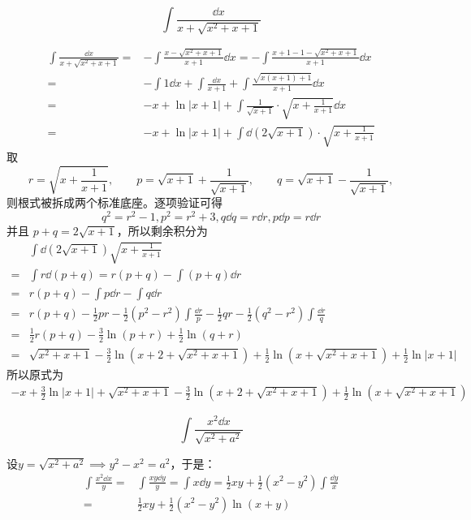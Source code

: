 \begin{example}
\[\int\frac{\dd x}{x+\sqrt{x^2+x+1}}\]
\end{example}
\begin{solution}
\begin{align*}
\int\frac{\dd x}{x+\sqrt{x^2+x+1}}=&-\int\frac{x-\sqrt{x^{2}+x+1}}{x+1}\dd x=-\int\frac{x+1-1-\sqrt{x^{2}+x+1}}{x+1}\dd x\\
=&-\int1\dd x+\int\frac{\dd x}{x+1}+\int\frac{\sqrt{x(x+1)+1}}{x+1}\dd x\\
=&-x+\ln|x+1|+\int\frac{1}{\sqrt{x+1}}\cdot\sqrt{x+\frac{1}{x+1}}\dd x\\
=&-x+\ln|x+1|+\int \dd(2\sqrt{x+1})\cdot\sqrt{x+\frac{1}{x+1}}
\end{align*}
取
\[
r=\sqrt{x+\frac{1}{x+1}},\qquad
p=\sqrt{x+1}+\frac{1}{\sqrt{x+1}},\qquad
q=\sqrt{x+1}-\frac{1}{\sqrt{x+1}},
\]
则根式被拆成两个标准底座。逐项验证可得
\[q^2=r^2-1,p^2=r^2+3,q\dd q=r\dd r,p\dd p=r\dd r\]
并且 \(p+q=2\sqrt{x+1}\)，所以剩余积分为
\begin{align*}
&\int \dd(2\sqrt{x+1})\sqrt{x+\frac{1}{x+1}}\\
=&\int r\dd(p+q)=r(p+q)-\int(p+q)\dd r\\
=&r(p+q)-\int p\dd r-\int q\dd r\\
=&r(p+q)-\frac{1}{2}pr-\frac12(p^2-r^2)\int\frac{\dd r}{p}-\frac12qr-\frac12(q^2-r^2)\int\frac{\dd r}{q}\\
=&\frac12r(p+q)-\frac32\ln(p+r)+\frac12\ln(q+r)\\
=&\sqrt{x^2+x+1}-\frac32\ln(x+2+\sqrt{x^2+x+1})+\frac12\ln(x+\sqrt{x^2+x+1})+\frac12\ln|x+1|
\end{align*}
所以原式为
\begin{align*}
-x+\frac32\ln|x+1|+\sqrt{x^2+x+1}-\frac32\ln(x+2+\sqrt{x^2+x+1})+\frac12\ln(x+\sqrt{x^2+x+1})
\end{align*}
\end{solution}

\begin{example}
\[\int\frac{x^2\dd x}{\sqrt{x^2+a^2}}\]
\end{example}
\begin{solution}
设$y=\sqrt{x^2+a^2}\implies y^2-x^2=a^2$，于是：
\begin{align*}
\int\frac{x^2\dd x}{y}=&\int\frac{xy\dd y}{y}=\int x\dd y=\frac12xy+\frac12(x^2-y^2)\int\frac{\dd y}{x}\\
=&\frac12xy+\frac12(x^2-y^2)\ln(x+y)
\end{align*}
\end{solution}

